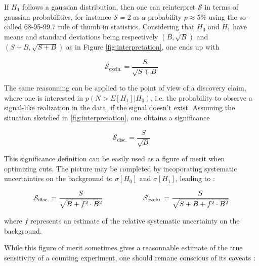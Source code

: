     If $H_1$ follows a gaussian distribution, then one can reinterpret $\mathcal{S}$ in terms
    of gaussian probabilities, for instance $\mathcal{S} = 2$ as a probability $p\approx5\%$ 
    using the so-called 68-95-99.7 rule of thumb in statistics. Considering that $H_0$ and 
    $H_1$ have means and standard deviations being respectively $(B,\sqrt{B})$ and 
    $(S+B,\sqrt{S+B})$ as in Figure \ref{fig:interpretation}, one ends up with 

    $$ \mathcal{S}_\text{exclu.} = \frac{S}{\sqrt{S+B}}$$

    The same reasonning can be applied to the point of view of a discovery claim, where
    one is interested in $p(N > E[H_1]|H_0)$, i.e. the probability to observe a 
    signal-like realization in the data, if the signal doesn't exist. Assuming the situation
    sketched in \ref{fig:interpretation}, one obtains a significance

    $$ \mathcal{S}_\text{disc.} = \frac{S}{\sqrt{B}}$$

    This significance definition can be easily used as a figure of merit when optimizing
    cuts. The picture may be completed by incoporating systematic uncertainties on the
    background to $\sigma[H_0]$ and $\sigma[H_1]$, leading to :
    
    \begin{equation}
       \mathcal{S}_\text{disc.} = \frac{S}{\sqrt{B+f^2 \cdot B^2}}
       \hspace*{2cm} 
       \mathcal{S}_\text{exclu.} = \frac{S}{\sqrt{S+B+f^2 \cdot B^2}}
       \label{FoM}
   \end{equation}

    where $f$ represents an estimate of the relative systematic uncertainty on the background.
    
    While this figure of merit sometimes gives a reasonnable estimate of the true 
    sensitivity of a counting experiment, one should remane conscious of its caveats 
    \cite{Punzi} :


